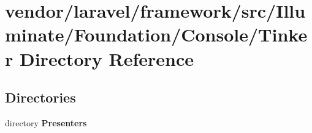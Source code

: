 \section{vendor/laravel/framework/src/\+Illuminate/\+Foundation/\+Console/\+Tinker Directory Reference}
\label{dir_9d04b366543e57491ba4e0d6ee28fc96}
\subsection*{Directories}
\begin{DoxyCompactItemize}
\item 
directory {\bf Presenters}
\end{DoxyCompactItemize}
